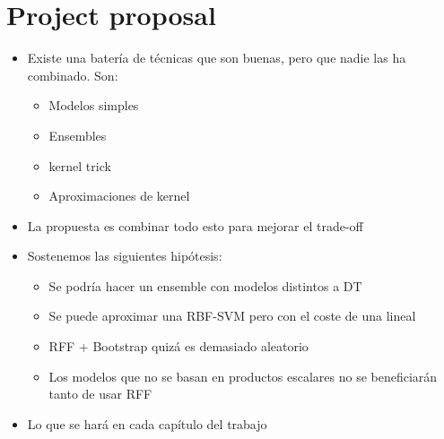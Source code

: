 
\section{Project proposal}

\begin{note}
  \begin{itemize}
    \item Existe una batería de técnicas que son buenas, pero que nadie las
    ha combinado. Son:
    \begin{itemize}
      \item Modelos simples
      \item Ensembles
      \item kernel trick
      \item Aproximaciones de kernel
    \end{itemize}
    \item La propuesta es combinar todo esto para mejorar el trade-off
    \item Sostenemos las siguientes hipótesis:
    \begin{itemize}
      \item Se podría hacer un ensemble con modelos distintos a DT
      \item Se puede aproximar una RBF-SVM pero con el coste de una lineal
      \item RFF + Bootstrap quizá es demasiado aleatorio
      \item Los modelos que no se basan en productos escalares no se
      beneficiarán tanto de usar RFF
    \end{itemize}
    \item Lo que se hará en cada capítulo del trabajo
  \end{itemize}
\end{note}

